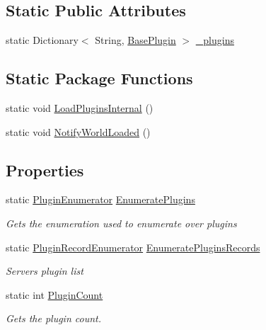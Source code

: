 \subsection*{Static Public Attributes}
\begin{DoxyCompactItemize}
\item 
static Dictionary$<$ String, \hyperlink{classOTA_1_1Plugin_1_1BasePlugin}{Base\+Plugin} $>$ \hyperlink{classOTA_1_1PluginManager_a4002719aac236b2ec7f902c0873ea9d3}{\+\_\+plugins}
\end{DoxyCompactItemize}
\subsection*{Static Package Functions}
\begin{DoxyCompactItemize}
\item 
static void \hyperlink{classOTA_1_1PluginManager_a53bee64266f90bb5b551527c0a5dba69}{Load\+Plugins\+Internal} ()
\item 
static void \hyperlink{classOTA_1_1PluginManager_a7c4d2bc2cf63bd1bfaac1e179fdeb5ea}{Notify\+World\+Loaded} ()
\end{DoxyCompactItemize}
\subsection*{Properties}
\begin{DoxyCompactItemize}
\item 
static \hyperlink{structOTA_1_1PluginManager_1_1PluginEnumerator}{Plugin\+Enumerator} \hyperlink{classOTA_1_1PluginManager_abae2c31019ccb9a5dd365028bf2efd30}{Enumerate\+Plugins}
\begin{DoxyCompactList}\small\item\em Gets the enumeration used to enumerate over plugins \end{DoxyCompactList}\item 
static \hyperlink{structOTA_1_1PluginManager_1_1PluginRecordEnumerator}{Plugin\+Record\+Enumerator} \hyperlink{classOTA_1_1PluginManager_a1c871ff4915f084fb918eab859297e0a}{Enumerate\+Plugins\+Records}
\begin{DoxyCompactList}\small\item\em Server\textquotesingle{}s plugin list \end{DoxyCompactList}\item 
static int \hyperlink{classOTA_1_1PluginManager_a676977726f3e4e7364b93bb3b278a027}{Plugin\+Count}
\begin{DoxyCompactList}\small\item\em Gets the plugin count. \end{DoxyCompactList}\end{DoxyCompactItemize}


